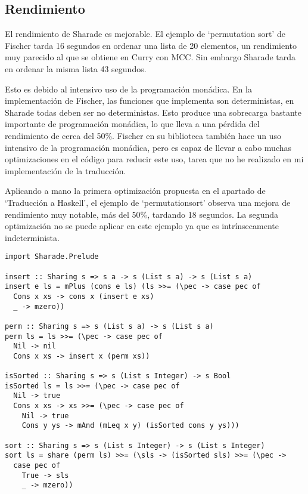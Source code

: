 \documentclass[class=article, crop=false]{standalone}
\begin{document}
\subsection{Rendimiento}\label{sec:rendimiento}

El rendimiento de Sharade es mejorable. El ejemplo de `permutation sort' de
Fischer\cite{fischer2011purely} tarda 16 segundos en ordenar una lista de 20 elementos, un
rendimiento muy parecido al que se obtiene en Curry con MCC\cite{lux2003munster}. Sin embargo
Sharade tarda en ordenar la misma lista 43 segundos.

Esto es debido al intensivo uso de la programación monádica. En la implementación de Fischer,
las funciones que implementa son deterministas, en Sharade todas deben ser no deterministas.
Esto produce una sobrecarga bastante importante de programación monádica, lo que lleva a una
pérdida del rendimiento de cerca del 50\%. Fischer en su biblioteca también hace un uso
intensivo de la programación monádica, pero es capaz de llevar a cabo muchas optimizaciones
en el código para reducir este uso, tarea que no he realizado en mi implementación de la
traducción.

Aplicando a mano la primera optimización propuesta en el apartado de `Traducción a Haskell',
el ejemplo de `permutationsort' observa una mejora de rendimiento muy notable, más del 50\%,
tardando 18 segundos. La segunda optimización no se puede aplicar en este ejemplo ya que es
intrínsecamente indeterminista.

\begin{verbatim}
import Sharade.Prelude

insert :: Sharing s => s a -> s (List s a) -> s (List s a)
insert e ls = mPlus (cons e ls) (ls >>= (\pec -> case pec of
  Cons x xs -> cons x (insert e xs)
  _ -> mzero))

perm :: Sharing s => s (List s a) -> s (List s a)
perm ls = ls >>= (\pec -> case pec of
  Nil -> nil
  Cons x xs -> insert x (perm xs))

isSorted :: Sharing s => s (List s Integer) -> s Bool
isSorted ls = ls >>= (\pec -> case pec of
  Nil -> true
  Cons x xs -> xs >>= (\pec -> case pec of
    Nil -> true
    Cons y ys -> mAnd (mLeq x y) (isSorted cons y ys)))

sort :: Sharing s => s (List s Integer) -> s (List s Integer)
sort ls = share (perm ls) >>= (\sls -> (isSorted sls) >>= (\pec ->
  case pec of
    True -> sls
    _ -> mzero))
\end{verbatim}
\end{document}
